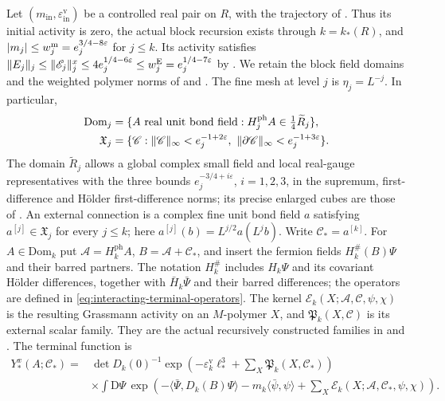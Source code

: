 Let $(m_{\mathrm{in}},\varepsilon_{\mathrm{in}}^{\mathrm v})$
be a controlled real pair on $R$, with the trajectory
of \cite[\S7.1]{CoverTuning}. Thus its initial activity is zero,
the actual block recursion exists through $k=k_*(R)$, and
$|m_j|\le w_j^{\rm m}=e_j^{3/4-8\varepsilon}$ for $j\le k$.
Its activity satisfies
$\|E_j\|_j\le\|\mathscr E_j\|_j^x\le
4e_j^{1/4-6\varepsilon}\le w_j^{\rm E}
=e_j^{1/4-7\varepsilon}$
by \cite[Proposition~7.1]{CoverTuning}.
We retain the block field domains and the weighted polymer
norms of \cite[\S2.2--2.3]{NormalizedContraction} and \cite[\S2.3, \S5.1]{NonlinearStep}. The fine mesh at level
$j$ is $\eta_j=L^{-j}$. In particular,
\begin{align*}
 \mathrm{Dom}_j
  &=\{A\text{ real unit bond field}:
           H_j^{\rm ph}A\in\tfrac14\widetilde R_j\},\\*
 \mathfrak X_j
  &=\{\mathscr C:\|\mathscr C\|_\infty<e_j^{-1+2\varepsilon},\
                 \|\partial\mathscr C\|_\infty<e_j^{-1+3\varepsilon}\}.
\end{align*}
The domain $\widetilde R_j$ allows a global complex small field
and local real-gauge representatives with the three bounds
$e_j^{-3/4+i\varepsilon}$, $i=1,2,3$, in the supremum,
first-difference and H\"older first-difference norms;
its precise enlarged cubes are those of
\cite[\S6]{MaxwellBlock}.
An external connection is a complex fine unit bond
field $a$ satisfying
$a^{[j]}\in\mathfrak X_j$ for every $j\le k$;
here $a^{[j]}(b)=L^{j/2}a(L^jb)$.
Write $\mathscr C_*=a^{[k]}$.
For $A\in\mathrm{Dom}_k$ put
$\mathscr A=H_k^{\mathrm{ph}}A$,
$B=\mathscr A+\mathscr C_*$, and insert the fermion
fields $H_k^\#(B)\Psi$ and their barred partners.
The notation $H_k^\#$ includes $H_k\Psi$ and its covariant
H\"older differences, together with
$\bar H_k\bar\Psi$ and their barred differences;
the operators are defined in
\eqref{eq:interacting-terminal-operators}.
The kernel $\mathscr E_k(X;\mathscr A,\mathscr C,\psi,\chi)$
is the resulting Grassmann activity on an $M$-polymer $X$,
and $\mathfrak P_k(X,\mathscr C)$ is its external scalar family.
They are the actual recursively constructed families in
\cite[(7)]{NonlinearStep} and \cite[(55)--(57)]{CoverTuning}.
The terminal function is
\begin{align}
 Y_*^x(A;\mathscr C_*)
   ={}&\det D_k(0)^{-1}
        \exp\left(-\varepsilon_k^{\mathrm v}\ell_*^3
                       +\sum_X\mathfrak P_k(X,\mathscr C_*)\right)
       \nonumber\\
   &\times\int\mathrm D\Psi\,
      \exp\left(-\langle\bar\Psi,D_k(B)\Psi\rangle
                -m_k\langle\bar\psi,\psi\rangle
                       +\sum_X\mathscr E_k(X;\mathscr A,\mathscr C_*,
                                                        \psi,\chi)\right).
                                      \label{eq:term-Y-density}
\end{align}
